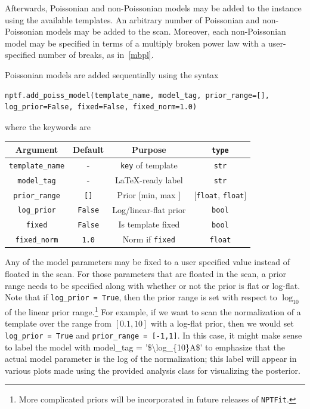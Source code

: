 Afterwards, Poissonian and non-Poissonian models may be added to the instance using the available templates. An arbitrary number of Poissonian and non-Poissonian models may be added to the scan. Moreover, each non-Poissonian model may be specified in terms of a multiply broken power law with a user-specified number of breaks, as in~\eqref{mbpl}.  

Poissonian models are added sequentially using the syntax
\begin{lstlisting}
nptf.add_poiss_model(template_name, model_tag, prior_range=[], log_prior=False, fixed=False, fixed_norm=1.0)
\end{lstlisting}
where the keywords are
\vspace{+0.02in}
\begin{center}
\begin{tabular}{ cccc}
\toprule
Argument &  Default & Purpose & \lstinline!type! \\ 
\midrule
\lstinline!template_name! & - & \lstinline!key! of template & \lstinline!str! \\ 
\lstinline!model_tag! & - & \LaTeX-ready label & \lstinline!str!  \\ 
\lstinline!prior_range! & \lstinline![]! & Prior [min, max ] & [\lstinline!float!, \lstinline!float!]  \\ 
\lstinline!log_prior! & \lstinline!False! & Log/linear-flat prior & \lstinline!bool!  \\ 
\lstinline!fixed! & \lstinline!False! & Is template fixed & \lstinline!bool!  \\ 
\lstinline!fixed_norm! & \lstinline!1.0! & Norm if  \lstinline!fixed! & \lstinline!float!  \\ 
\bottomrule
\end{tabular} 
\end{center}
Any of the model parameters may be fixed to a user specified value instead of floated in the scan.  For those parameters that are floated in the scan, a prior range needs to be specified along with whether or not the prior is flat or log-flat.
Note that if \lstinline{log_prior = True}, then the prior range is set with respect to $\log_{10}$ of the linear prior range.\footnote{More complicated priors will be incorporated in future releases of \texttt{NPTFit}.}  For example, if we want to scan the normalization of a template over the range from $[0.1,10]$ with a log-flat prior, then we would set \lstinline{log_prior = True} and \lstinline{prior_range = [-1,1]}.  In this case, it might make sense to label the model with {\footnotesize\ttfamily \textcolor{black}{model\_tag =}} {\footnotesize\ttfamily \textcolor{deepred}{'\$\textbackslash log\_\{10\}A\$'}}  to emphasize that the actual model parameter is the log of the normalization; 
this label will appear in various plots made using the provided analysis class for visualizing the posterior.


